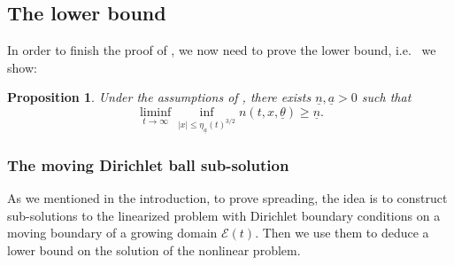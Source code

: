 \documentclass[11pt]{article}    %
\newtheorem{prop}[theorem]{Proposition}
\newcommand{\PP}{\mathbb{P}}
\begin{document}
%











\subsection{The lower bound}


In order to finish the proof of , we now need to prove the lower bound, i.e.~ we show:

\begin{prop}\label{prop:lowerboundacc}
Under the assumptions of , there exists $\underline n, \underline{a}>0$ such that
	\[
		\liminf_{t \to \infty} \inf_{|x| \leq \eta_{\underline{a}}(t)^{3/2}} n(t,x,\underline\theta) \geq \underline n.
	\]
\end{prop}

\subsubsection*{The moving Dirichlet ball sub-solution}

As we mentioned in the introduction, to prove spreading, the idea is to construct sub-solutions to the linearized problem with Dirichlet boundary conditions on a moving boundary of a growing domain $\mathcal{E}(t)$.  Then we use them to deduce a lower bound on the solution of the nonlinear problem.  
\end{document}
